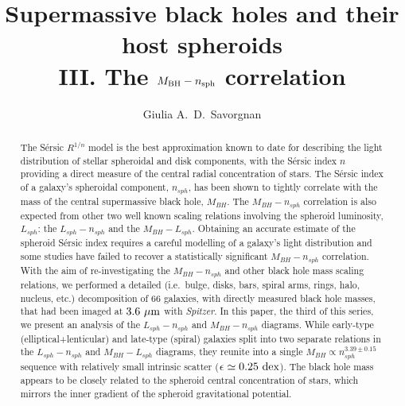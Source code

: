 \documentclass[preprint2]{emulateapj}
\begin{document}
\title{Supermassive black holes and their host spheroids \\ 
III. The $M_{\rm BH} - \lowercase{n_{\rm sph}}$ correlation }


\author{Giulia A.~D.~Savorgnan}


\begin{abstract}
The S\'ersic $R^{1/n}$ model is the best approximation known to date for describing the light distribution 
of stellar spheroidal and disk components, 
with the S\'ersic index $n$ providing a direct measure of the central radial concentration of stars. 
The S\'ersic index of a galaxy's spheroidal component, $n_{sph}$, has been shown to tightly correlate 
with the mass of the central supermassive black hole, $M_{BH}$. 
The $M_{BH}-n_{sph}$ correlation is also expected from other two well known scaling relations 
involving the spheroid luminosity, $L_{sph}$: 
the $L_{sph}-n_{sph}$ and the $M_{BH}-L_{sph}$. 
Obtaining an accurate estimate of the spheroid S\'ersic index requires a careful modelling of a galaxy's light distribution 
and some studies have failed to recover a statistically significant $M_{BH}-n_{sph}$ correlation. 
With the aim of re-investigating the $M_{BH}-n_{sph}$ 
and other black hole mass scaling relations, 
we performed a detailed (i.e.~bulge, disks, bars, spiral arms, rings, halo, nucleus, etc.) 
decomposition of 66 galaxies, with directly measured black hole masses, 
that had been imaged at $3.6\rm~\mu m$ with \emph{Spitzer}. 
In this paper, the third of this series, we present an analysis of the $L_{sph}-n_{sph}$ 
and $M_{BH}-n_{sph}$ diagrams. 
While early-type (elliptical+lenticular) and late-type (spiral) galaxies split into two separate relations 
in the $L_{sph}-n_{sph}$ and $M_{BH}-L_{sph}$ diagrams, 
they reunite into a single $M_{BH} \propto n_{sph}^{3.39 \pm 0.15}$ sequence
with relatively small intrinsic scatter ($\epsilon \simeq 0.25 \rm~dex$). 
The black hole mass appears to be closely related to the spheroid central concentration of stars, 
which mirrors the inner gradient of the spheroid gravitational potential. 
\end{abstract}


\end{document}
